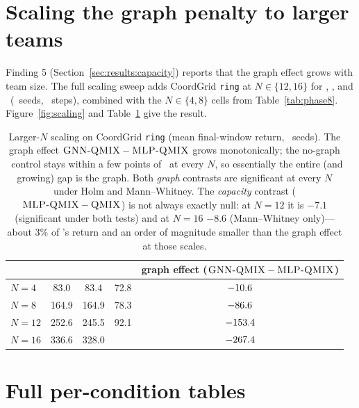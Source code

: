 \begin{appendices}
\section{Scaling the graph penalty to larger teams}
\label{app:scaling}

Finding 5 (Section~\ref{sec:results:capacity}) reports that the graph
effect grows with team size. The full scaling sweep adds CoordGrid
\texttt{ring} at $N\in\{12,16\}$ for \qmix, \mlpqmix, and \gnnqmix\
(\PEseeds\ seeds, \PEsteps\ steps), combined with the $N\in\{4,8\}$ cells
from Table~\ref{tab:phase8}. Figure~\ref{fig:scaling} and
Table~\ref{tab:scaling} give the result.


\begin{table}[!ht]
  \centering
  \footnotesize
  \caption{Larger-$N$ scaling on CoordGrid \texttt{ring} (mean final-window
  return, \PEseeds\ seeds). The graph effect $\textsc{GNN-QMIX}-\textsc{MLP-QMIX}$ grows
  monotonically; the no-graph \mlpqmix\ control stays within a few points of
  \qmix\ at every $N$, so essentially the entire (and growing) gap is the
  graph. Both \emph{graph} contrasts are significant at every $N$ under Holm
  and Mann--Whitney. The \emph{capacity} contrast ($\textsc{MLP-QMIX}-\textsc{QMIX}$) is not
  always exactly null: at $N{=}12$ it is $-7.1$ (significant under both
  tests) and at $N{=}16$ $-8.6$ (Mann--Whitney only)---about $3\%$ of
  \qmix's return and an order of magnitude smaller than the graph effect at
  those scales.}
  \label{tab:scaling}
  \begin{tabular}{lcccc}
    \toprule
    & \qmix & \mlpqmix & \gnnqmix & graph effect ($\textsc{GNN-QMIX}-\textsc{MLP-QMIX}$) \\
    \midrule
    $N=4$  & 83.0 & 83.4 & 72.8 & $-10.6$ \\
    $N=8$  & 164.9 & 164.9 & 78.3 & $-86.6$ \\
    $N=12$ & 252.6 & 245.5 & 92.1 & $-153.4$ \\
    $N=16$ & 336.6 & 328.0 & \PSgnnNsixteen & $-267.4$ \\
    \bottomrule
  \end{tabular}
\end{table}

\section{Full per-condition tables}
\label{app:fulltables}


\end{appendices}
